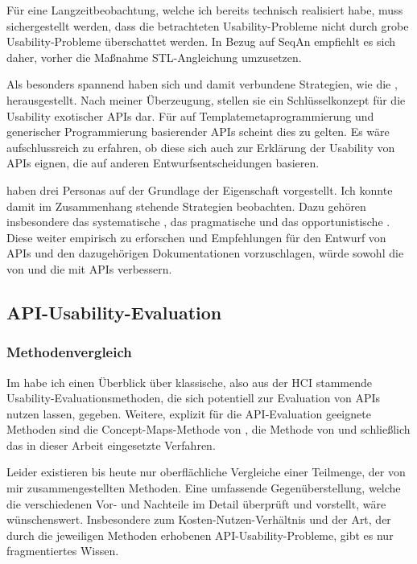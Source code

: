 Für eine Langzeitbeobachtung, welche ich bereits technisch realisiert habe, muss sichergestellt werden, dass die betrachteten Usability-Probleme nicht durch grobe Usability-Probleme überschattet werden. In Bezug auf SeqAn empfiehlt es sich daher, vorher die Maßnahme STL-Angleichung umzusetzen.

Als besonders spannend haben sich  und damit verbundene Strategien, wie die , herausgestellt. Nach meiner Überzeugung, stellen sie ein Schlüsselkonzept für die Usability exotischer APIs dar. Für auf Templatemetaprogrammierung und generischer Programmierung basierender APIs scheint dies zu gelten. Es wäre aufschlussreich zu erfahren, ob diese sich auch zur Erklärung der Usability von APIs eignen, die auf anderen Entwurfsentscheidungen basieren.

\cite{Stylos:2007jb,clarke:DSP:2007:1080} haben drei Personas auf der Grundlage der Eigenschaft  vorgestellt. Ich konnte damit im Zusammenhang stehende Strategien beobachten. Dazu gehören insbesondere das systematische , das pragmatische  und das opportunistische . Diese weiter empirisch zu erforschen und Empfehlungen für den Entwurf von APIs und den dazugehörigen Dokumentationen vorzuschlagen, würde sowohl die  von und die  mit APIs verbessern.
  

\subsection{API-Usability-Evaluation}

\subsubsection{Methodenvergleich}

Im  habe ich einen Überblick über klassische, also aus der HCI stammende Usability-Evaluationsmethoden, die sich potentiell zur Evaluation von APIs nutzen lassen, gegeben. Weitere, explizit für die API-Evaluation geeignete Methoden sind die Concept-Maps-Methode von \citep{Tenny:2011jp}, die Methode von \cite{Grill:2012jm} und schließlich das in dieser Arbeit eingesetzte Verfahren.

Leider existieren bis heute nur oberflächliche Vergleiche \citep{Beaton:2008ix,Barth:2011uh} einer Teilmenge, der von mir zusammengestellten Methoden. Eine umfassende Gegenüberstellung, welche die verschiedenen Vor- und Nachteile im Detail überprüft und vorstellt, wäre wünschenswert. Insbesondere zum Kosten-Nutzen-Verhältnis und der Art, der durch die jeweiligen Methoden erhobenen API-Usability-Probleme, gibt es nur fragmentiertes Wissen.

